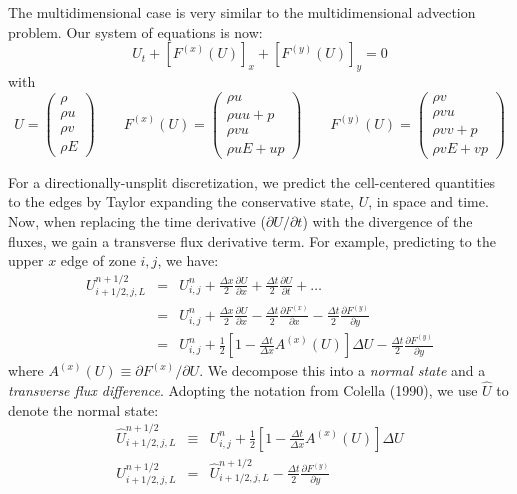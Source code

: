 \documentclass[11pt]{article}
\begin{document}
The multidimensional case is very similar to the multidimensional
advection problem.  Our system of equations is now:
\begin{equation}
U_t + [F^{(x)}(U)]_x + [F^{(y)}(U)]_y = 0
\end{equation}
with
\begin{equation}
U = \left ( \begin{array}{c} \rho \\ \rho u \\ \rho v \\ \rho E \end{array} \right )
%
\qquad
%
F^{(x)}(U) = \left ( \begin{array}{c} \rho u \\ \rho uu + p \\ \rho v u \\ \rho u E + up \end{array} \right )
%
\qquad
F^{(y)}(U) = \left ( \begin{array}{c} \rho v \\ \rho vu     \\ \rho v v + p \\ \rho v E + vp \end{array} \right )
\end{equation}

For a directionally-unsplit discretization, we predict the
cell-centered quantities to the edges by Taylor expanding the
conservative state, $U$, in space and time.  Now, when replacing the
time derivative ($\partial U/\partial t$) with the divergence of the
fluxes, we gain a transverse flux derivative term.  For example,
predicting to the upper $x$ edge of zone $i,j$, we have:
\begin{eqnarray}
U_{i+1/2,j,L}^{n+1/2} &=& U_{i,j}^n + \frac{\Delta x}{2} \frac{\partial U}{\partial x} 
                            + \frac{\Delta t}{2} \frac{\partial U}{\partial t} + \ldots \\
&=& U_{i,j}^n + \frac{\Delta x}{2} \frac{\partial U}{\partial x} 
                            - \frac{\Delta t}{2} \frac{\partial F^{(x)}}{\partial x} 
                            - \frac{\Delta t}{2} \frac{\partial F^{(y)}}{\partial y} \\
&=& U_{i,j}^n + \frac{1}{2} \left [ 1 - \frac{\Delta t}{\Delta x} A^{(x)}(U) \right ] \Delta U 
                            - \frac{\Delta t}{2} \frac{\partial F^{(y)}}{\partial y} \label{eq:Utaylorstate}
\end{eqnarray}
where $A^{(x)}(U) \equiv \partial F^{(x)} / \partial U$.  We decompose
this into a {\em normal state} and a {\em transverse flux difference}.
Adopting the notation from Colella (1990), we use $\hat{U}$ to denote
the normal state:
\begin{eqnarray}
\hat{U}_{i+1/2,j,L}^{n+1/2} &\equiv& U_{i,j}^n 
      + \frac{1}{2} \left [ 1 - \frac{\Delta t}{\Delta x} A^{(x)}(U) \right ] \Delta U \\
U_{i+1/2,j,L}^{n+1/2} &=& \hat{U}_{i+1/2,j,L}^{n+1/2}
                            - \frac{\Delta t}{2} \frac{\partial F^{(y)}}{\partial y}  \label{eq:fullleftstate}
\end{eqnarray}
\end{document}
